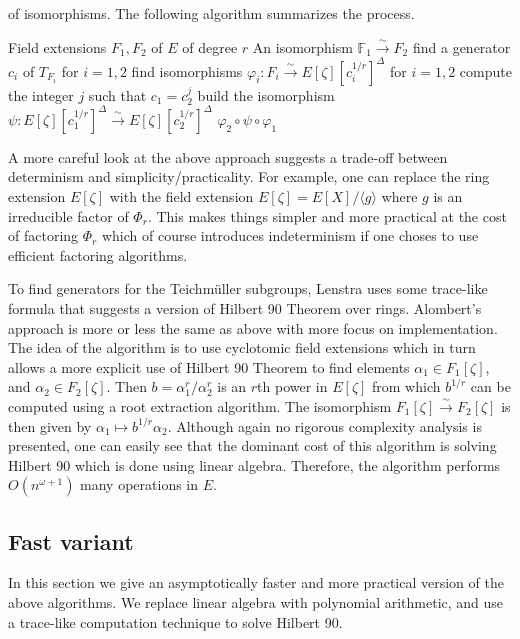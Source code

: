 \documentclass[12pt]{article}
\theoremstyle{plain}
\theoremstyle{definition}
\newcommand{\ang}[1]{\langle#1\rangle}
\def\F{\ensuremath{\mathbb{F}}}
\newcounter{algorithm}
\begin{document}
of isomorphisms. The following algorithm summarizes the process.
\begin{algorithm}[Lesntra]
	\begin{algorithmic}[1]
		\REQUIRE Field extensions $F_1, F_2$ of $E$ of degree $r$
		\ENSURE An isomorphism $\F_1 \xrightarrow{\sim} F_2$
		\STATE find a generator $c_i$ of $T_{F_i}$ for $i = 1, 2$
		\STATE find isomorphisms $\varphi_i: F_i \xrightarrow{\sim} E[\zeta][c_i^{1/r}]^\Delta$ for 
		$i = 1, 2$
		\STATE compute the integer $j$ such that $c_1 = c_2^j$
		\STATE build the isomorphism $\psi: E[\zeta][c_1^{1/r}]^\Delta \xrightarrow{\sim} 
		E[\zeta][c_2^{1/r}]^\Delta$
		\RETURN $\varphi_2 \circ \psi \circ \varphi_1$
	\end{algorithmic}
\end{algorithm}
A more careful look at the above approach suggests a trade-off between determinism and 
simplicity/practicality. For example, one can replace the ring extension $E[\zeta]$ with the field 
extension $E[\zeta] = E[X] / \ang{g}$ where $g$ is an irreducible factor of $\Phi_r$. This makes 
things simpler and more practical at the cost of factoring $\Phi_r$ which of course introduces 
indeterminism if one choses to use efficient factoring algorithms.

To find generators for the Teichm\"{u}ller subgroups, Lenstra uses some trace-like formula that 
suggests a version of Hilbert 90 Theorem over rings. Alombert's approach is more or less the same 
as above with more focus on implementation. The idea of the algorithm is to use cyclotomic field 
extensions which in turn allows a more explicit use of Hilbert 90 Theorem to find elements 
$\alpha_1 \in F_1[\zeta]$, and $\alpha_2 \in F_2[\zeta]$. Then $b = \alpha_1^r / \alpha_2^r$ is an 
$r$th power in $E[\zeta]$ from which $b^{1/r}$ can be computed using a root extraction algorithm. 
The isomorphism $F_1[\zeta] \xrightarrow{\sim} F_2[\zeta]$ is then given by $\alpha_1 \mapsto 
b^{1/r}\alpha_2$. Although again no rigorous complexity analysis is presented, one can easily see 
that the dominant cost of this algorithm is solving Hilbert 90 which is done using linear algebra. 
Therefore, the algorithm performs $O(n^{\omega + 1})$ many operations in $E$.


\subsection{Fast variant}
In this section we give an asymptotically faster and more practical version of the above 
algorithms. We replace linear algebra with polynomial arithmetic, and use a trace-like computation 
technique to solve Hilbert 90. 
\end{document}
